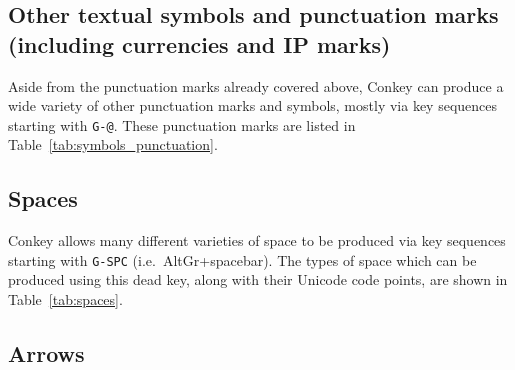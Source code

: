 \documentclass[oneside]{memoir}
\newcommand{\key}{\verb}
\begin{document}
{{{\subsection{Other textual symbols and punctuation marks (including currencies and IP marks)}
\label{sec:symbols_punctuation}

Aside from the punctuation marks already covered above,
  Conkey can produce a wide variety of other punctuation marks and symbols,
  mostly via key sequences starting with \key|G-@|.
These punctuation marks are listed in Table~\ref{tab:symbols_punctuation}.

\subsection{Spaces}
\label{sec:spaces}

Conkey allows many different varieties of space to be produced via key sequences starting with \key|G-SPC| (i.e.\ AltGr+spacebar).
The types of space which can be produced using this dead key, along with their Unicode code points,
  are shown in Table~\ref{tab:spaces}.

\subsection{Arrows}
\label{sec:arrows}

}}}
\end{document}
